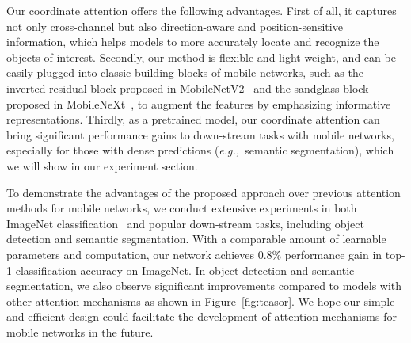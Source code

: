 \documentclass[final]{cvpr}
\def\eg{\emph{e.g.,~}}
\begin{document}


Our coordinate attention offers the following advantages.
%
First of all, it captures not only cross-channel but also direction-aware and position-sensitive information, which helps models to 
more accurately locate and recognize the objects of interest.
%
Secondly, our method is flexible and light-weight, and can be easily plugged into classic building blocks of mobile networks, such as the inverted residual block proposed in MobileNetV2~\cite{sandler2018mobilenetv2} and the sandglass block proposed in MobileNeXt~\cite{daquan2020rethinking},
to augment the features by emphasizing informative representations.
%
Thirdly, as a pretrained model, our coordinate attention can bring  significant performance gains to down-stream tasks with mobile networks, especially for those with dense predictions (\eg semantic segmentation),  which we will show in our experiment section.


To demonstrate the advantages of the proposed approach over previous attention methods for mobile networks,
we conduct extensive experiments in both ImageNet classification~\cite{russakovsky2015imagenet} and popular down-stream tasks, including object detection and semantic segmentation.
%
With a comparable amount of learnable parameters and computation, our network achieves 0.8\% performance gain in top-1 classification accuracy on ImageNet.
%
In object detection and semantic segmentation, we also observe significant improvements compared to models with other attention mechanisms as shown in Figure~\ref{fig:teasor}.
%
%
We hope our simple and efficient design could facilitate the development of attention mechanisms for mobile networks in the future.




\end{document}
